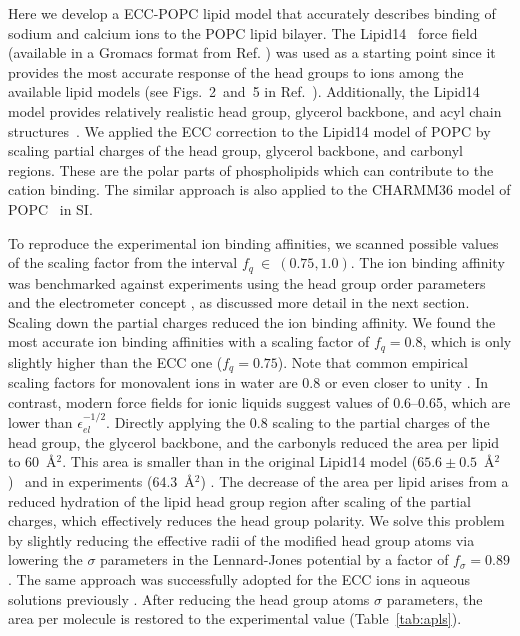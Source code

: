 \documentclass[journal=jpcbfk,manuscript=article]{achemso}
\begin{document}
Here we develop a ECC-POPC lipid model that accurately describes binding 
of sodium and calcium ions to the POPC  lipid bilayer. 
The Lipid14~\cite{dickson14} force field 
(available in a Gromacs format from Ref. ) was used as a starting 
point since 
it provides the most accurate response of the head groups to ions among the available 
lipid models (see Figs.~2~and~5 in Ref.~). Additionally, the Lipid14 model 
provides relatively realistic head group, glycerol backbone, and acyl chain structures~\cite{dickson14,botan15}.
We applied the ECC correction 
to the Lipid14 model of POPC by scaling 
partial charges of the head group, glycerol 
backbone, and carbonyl regions. 
These are the polar parts of phospholipids which can 
contribute to the cation binding.
The similar approach is also applied to the CHARMM36 model of POPC~\cite{klauda10} in SI.

To reproduce the experimental ion binding affinities,
we scanned possible values of the scaling factor from the interval $f_q~\in~(0.75, 1.0)$.
The ion binding affinity was benchmarked against experiments
using the head group order parameters and the electrometer concept \cite{seelig87,catte16},
as discussed more detail in the next section.
Scaling down the partial charges reduced the ion binding affinity.
We found the most accurate ion binding affinities with a scaling factor of $f_q = 0.8$,
which is only slightly higher than the ECC one ($f_q=0.75$).
Note that common empirical scaling factors for monovalent ions in water are 0.8 or
even closer to unity \cite{benavides17,skinner14,nacleps}.  In contrast, modern force fields
for ionic liquids suggest values of 0.6--0.65, which are lower than $\epsilon^{-1/2}_{el}$\cite{holm14}.
Directly applying
the 0.8 scaling to the partial charges of the head group, the glycerol backbone, and
the carbonyls reduced the area per lipid to 60~\AA$^2$. This area is smaller than in the
original Lipid14 model ($65.6 \pm 0.5$~\AA$^2$)~\cite{dickson14} and in experiments
(64.3~\AA$^2$) \cite{kucerka11}. The decrease of the area per lipid arises from a
reduced hydration of the lipid head group region after scaling of the partial charges, which effectively
reduces the head group polarity. We solve this problem by slightly reducing the effective radii of
the modified head group atoms via lowering the $\sigma$ parameters in the Lennard-Jones potential by a
factor of $f_\sigma = 0.89$. The same approach was successfully adopted for the ECC ions in aqueous
solutions previously \cite{kohagen14, kohagen16, Pluharova2014, martinek17}. After reducing the head group atoms $\sigma$ parameters, the area per molecule is restored to the experimental value (Table~\ref{tab:apls}). 
\end{document}
